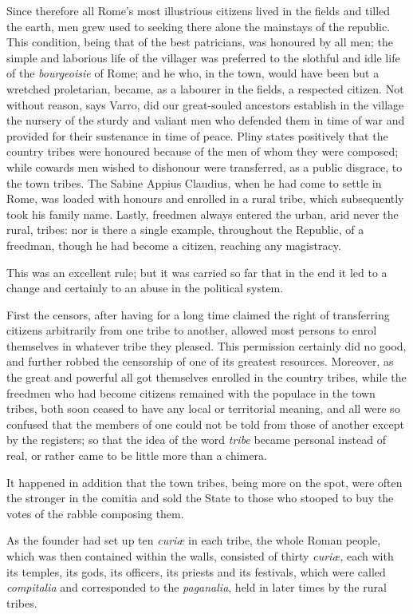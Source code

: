 \documentclass[12pt]{book}
\begin{document}
Since therefore all Rome's most illustrious citizens lived in the fields and tilled the earth, men grew used to seeking there alone the mainstays of the republic. This condition, being that of the best patricians, was honoured by all men; the simple and laborious life of the villager was preferred to the slothful and idle life of the \textit{bourgeoisie} of Rome; and he who, in the town, would have been but a wretched proletarian, became, as a labourer in the fields, a respected citizen. Not without reason, says Varro, did our great-souled ancestors establish in the village the nursery of the sturdy and valiant men who defended them in time of war and provided for their sustenance in time of peace. Pliny states positively that the country tribes were honoured because of the men of whom they were composed; while cowards men wished to dishonour were transferred, as a public disgrace, to the town tribes. The Sabine Appius Claudius, when he had come to settle in Rome, was loaded with honours and enrolled in a rural tribe, which subsequently took his family name. Lastly, freedmen always entered the urban, arid never the rural, tribes: nor is there a single example, throughout the Republic, of a freedman, though he had become a citizen, reaching any magistracy.

This was an excellent rule; but it was carried so far that in the end it led to a change and certainly to an abuse in the political system.

First the censors, after having for a long time claimed the right of transferring citizens arbitrarily from one tribe to another, allowed most persons to enrol themselves in whatever tribe they pleased. This permission certainly did no good, and further robbed the censorship of one of its greatest resources. Moreover, as the great and powerful all got themselves enrolled in the country tribes, while the freedmen who had become citizens remained with the populace in the town tribes, both soon ceased to have any local or territorial meaning, and all were so confused that the members of one could not be told from those of another except by the registers; so that the idea of the word \textit{tribe} became personal instead of real, or rather came to be little more than a chimera.

It happened in addition that the town tribes, being more on the spot, were often the stronger in the comitia and sold the State to those who stooped to buy the votes of the rabble composing them.

As the founder had set up ten \textit{curiæ} in each tribe, the whole Roman people, which was then contained within the walls, consisted of thirty \textit{curiæ}, each with its temples, its gods, its officers, its priests and its festivals, which were called \textit{compitalia} and corresponded to the \textit{paganalia}, held in later times by the rural tribes.
\end{document}
